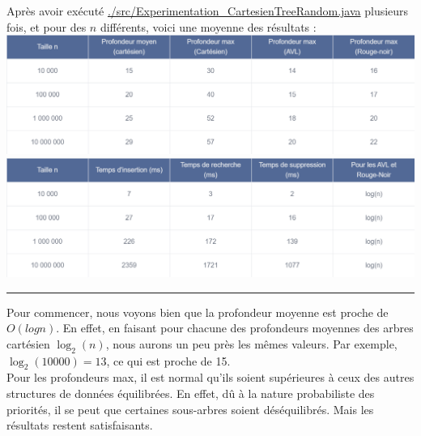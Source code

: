\documentclass[a4paper,12pt]{report}
\begin{document}
\begin{tcolorbox}[colback=gray!10, colframe=blue!30, coltitle=black, title=Analyse des métriques - 1/2]

    Après avoir exécuté \href{./src/Experimentation\_CartesienTreeRandom.java}{./src/Experimentation\_CartesienTreeRandom.java} plusieurs fois, et pour des \( n \) différents,
        voici une moyenne des résultats :\\

    \includegraphics[width=1\textwidth]{../images/profondeur.png}\\
    \includegraphics[width=1\textwidth]{../images/temps.png}

    \vspace{0.5cm}
    \hrule
    \vspace{0.5cm}

    Pour commencer, nous voyons bien que la profondeur moyenne est proche de \( O(log n) \). En effet, en faisant pour chacune des profondeurs moyennes des arbres cartésien
        \( \log_2(n) \), nous aurons un peu près les mêmes valeurs. Par exemple, \( \log_2(10000) = 13\), ce qui est proche de 15.\\

    Pour les profondeurs max, il est normal qu'ils soient supérieures à ceux des autres structures de données équilibrées. En effet, dû à la nature probabiliste 
        des priorités, il se peut que certaines sous-arbres soient déséquilibrés. Mais les résultats restent satisfaisants.

\end{tcolorbox}
\end{document}
